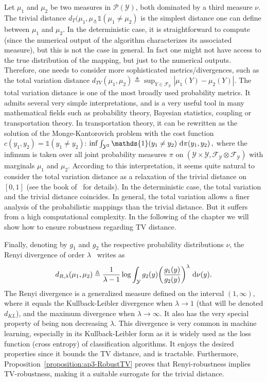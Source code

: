 Let  $\mu_1$ and $\mu_2$ be two measures in $\mathcal{P}(\mathcal{Y})$, both dominated by a third measure $\nu$.
The trivial distance $ d_{T}(\mu_1,\mu_ \triangleq \mathds{1}\left(\mu_1 \neq \mu_2\right)$ is the simplest distance one can define between $\mu_1$ and $\mu_2$.
In the deterministic case, it is straightforward to compute (since the numerical output of the algorithm characterizes its associated measure), but this is not the case in general.
In fact one might not have access to the true distribution of the mapping, but just to the numerical outputs.
Therefore, one needs to consider more sophisticated metrics/divergences, such as the total variation distance $d_{TV}(\mu_1,\mu_2) \triangleq \sup_{Y \in \mathcal{F}_{\mathcal{Y}}} |\mu_1 (Y) - \mu_2(Y)|$.
The total variation distance is one of the most broadly used probability metrics.
It admits several very simple interpretations, and is a very useful tool in many mathematical fields such as probability theory, Bayesian statistics, coupling or transportation theory.
In transportation theory, it can be rewritten as the solution of the Monge-Kantorovich problem with the cost function $c(y_1,y_2) =\mathds{1}\left(y_1 \neq y_2\right)$: $ \inf\int_{\mathcal{Y}^{2}}\mathds{1}\left(y_1 \neq y_2\right) \,\diff \pi(y_1,y_2)\, ,$ where the infimum is taken over all joint probability measures $\pi$ on $(\mathcal{Y}\times \mathcal{Y}, \mathcal{F}_{\mathcal{Y} } \otimes \mathcal{F}_{\mathcal{Y}})$ with marginals $\mu_1$ and $\mu_2$.
According to this interpretation, it seems quite natural to consider the total variation distance as a relaxation of the trivial distance on $[0,1]$ (see the book of~\citet{villani2008optimal} for details).
In the deterministic case, the total variation and the trivial distance coincides.
In general, the total variation allows a finer analysis of the probabilistic mappings than the trivial distance.
But it suffers from a high computational complexity.
In the following of the chapter we will show how to ensure robustness regarding TV distance.

Finally, denoting by $g_1$ and $g_2$ the respective probability distributions \wrt $\nu$, the Renyi divergence of order $\lambda$~\cite{renyi1961} writes as  
\begin{equation}
  d_{R,\lambda}(\mu_1,\mu_2) \triangleq \frac{1}{\lambda -1}\log \int_{\mathcal{Y}} g_2(y)  \left(\frac{g_1(y)}{g_2(y)}\right)^{\lambda} \,\diff \nu(y).
\end{equation}
The Renyi divergence is a generalized measure defined on the interval $(1,\infty)$, where it equals the Kullback-Leibler divergence when $\lambda \rightarrow 1$ (that will be denoted $d_{KL}$), and the maximum divergence when $\lambda \rightarrow \infty$.
It also has the very special property of being non decreasing \wrt $\lambda$.
This divergence is very common in machine learning, especially in its Kullback-Leibler form as it is widely used as the loss function (cross entropy) of classification algorithms.
It enjoys the desired properties  since it bounds the TV distance, and is tractable.
Furthermore, Proposition~\ref{proposition:ap3-RobustTV} proves that Renyi-robustness implies TV-robustness, making it a suitable surrogate for the trivial distance.

